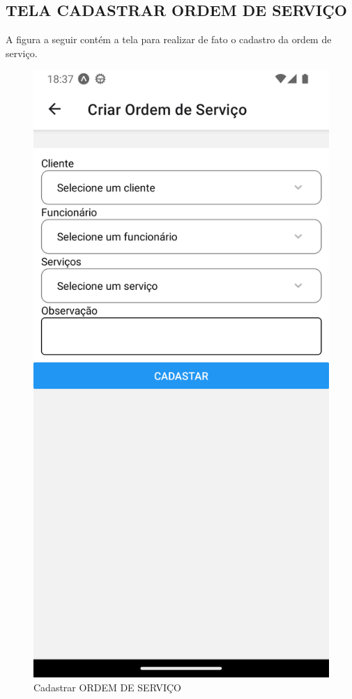 \subsection{TELA CADASTRAR ORDEM DE SERVIÇO}
A figura a seguir contém a tela para realizar de fato o cadastro da ordem de serviço.
\begin{figure}[htb]
	\caption{\label{fig_diagrama-classes} Cadastrar ORDEM DE SERVIÇO}
	\begin{center}
	    \includegraphics[width=0.5\linewidth]{imagens/criar-OS.png}
	\end{center}
\end{figure}

\newpage

